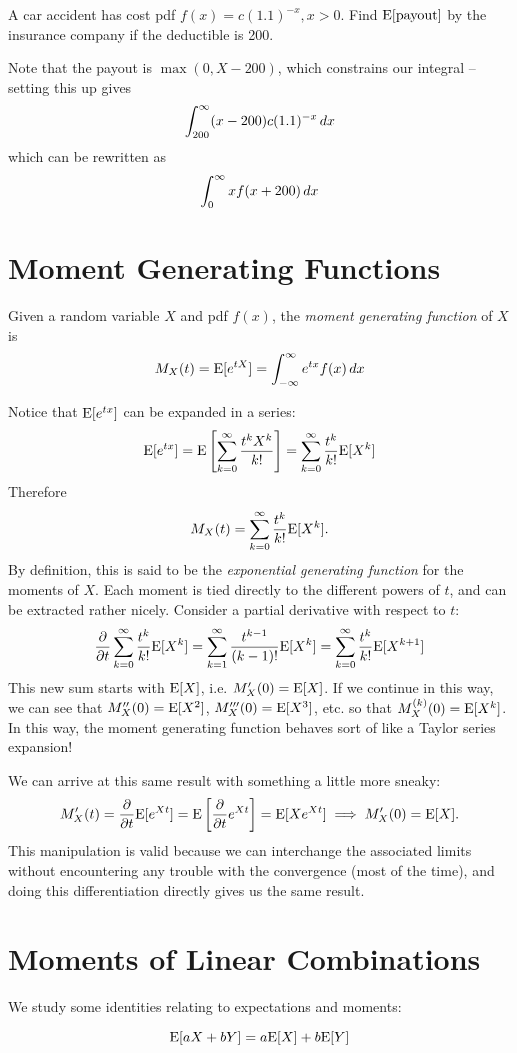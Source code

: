 \documentclass[../main.tex]{subfiles}
\begin{document}
\begin{example} %
    A car accident has cost pdf $f(x) = c(1.1)^{-x}, x>0$. Find $\mathrm E[\text{payout}]$ by the insurance company if the deductible is 200. 
\end{example}
\begin{solution}
Note that the payout is $\max(0, X-200)$, which constrains our integral -- setting this up gives 
\[
    \int_{200}^\infty (x-200) c (1.1)^{-x} \,dx
\]
which can be rewritten as 
\[
    \int_0^\infty x f(x+200) \,dx 
\]
\end{solution}

\section{Moment Generating Functions}
\begin{definition}
Given a random variable $X$ and pdf $f(x)$, the \textit{moment generating function} of $X$ is 
\[
    M_X(t) = \mathrm E[e^{tX}] = \int_{-\infty}^{\infty} e^{tx} f(x) \,dx
\]
\end{definition}
Notice that $\mathrm E[e^{tx}]$ can be expanded in a series: 
\[
    \mathrm E[e^{tx}] = \mathrm E\left[\sum_{k=0}^\infty \frac{t^k X^k}{k!}\right] = \sum_{k=0}^\infty \frac{t^k}{k!} \mathrm E[X^k] 
\]
Therefore
\[
M_X(t) = \sum_{k=0}^\infty \frac{t^k}{k!} \mathrm E[X^k].
\]
By definition, this is said to be the \textit{exponential generating function} for the moments of $X$. Each moment is tied directly to the different powers of $t$, and can be extracted rather nicely. Consider a partial derivative with respect to $t$: 
\[
    \frac{\partial }{\partial t} \sum_{k=0}^\infty \frac{t^k}{k!} \mathrm E[X^k]  = \sum_{k=1}^\infty \frac{t^{k-1}}{(k-1)!} \mathrm E[X^k] = \sum_{k=0}^\infty \frac{t^k}{k!} \mathrm E[X^{k+1}]
\]
This new sum starts with $\mathrm E[X]$, i.e. $M_X'(0) = \mathrm E[X]$. If we continue in this way, we can see that $M_X''(0) = \mathrm E[X^2]$, $M_X'''(0) = \mathrm E[X^3]$, etc. so that $M_X^{(k)}(0) = \mathrm E[X^k]$. In this way, the moment generating function behaves sort of like a Taylor series expansion!  

We can arrive at this same result with something a little more sneaky: 
\[
    M_X'(t) = \frac{\partial }{\partial t} \mathrm E[e^{Xt}] = \mathrm E\left[ \frac{\partial }{\partial t} e^{Xt} \right] = \mathrm E[Xe^{Xt}] \implies M_X'(0) = \mathrm E[X].
\]
This manipulation is valid because we can interchange the associated limits without encountering any trouble with the convergence (most of the time), and doing this differentiation directly gives us the same result. 

\section{Moments of Linear Combinations}
We study some identities relating to expectations and moments: 
\begin{example}
    \[\mathrm E[aX + bY] = a\mathrm E[X] + b \mathrm E[Y]\]
\end{example}
\end{document}
